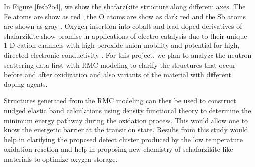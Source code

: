 In Figure \ref{fesb2o4}, we show the shafarzikite structure along different axes. The Fe atoms are show as \color{red} red \color{black}, the O atoms are show as \color{BrickRed} dark red \color{black} and the Sb atoms are shown as \color{Gray} gray \color{black}. Oxygen insertion into cobalt and lead doped derivatives of
shafarzikite show promise in applications of electro-catalysis due to their unique
1-D cation channels with high peroxide anion mobility and potential for high,
directed electronic conductivity \cite{Laune2017}. For this project, we plan to analyze the neutron
scattering data first with RMC modeling to clarify the structures that occur 
before and after oxidization and also variants of the material with different
doping agents.


Structures generated from the RMC modeling can then be used to construct nudged
elastic band \cite{Henkelman2000, Henkelman2000a} calculations using density functional theory to determine the minimum energy pathway during the oxidation process. This would allow one to know the energetic barrier at the transition state.  Results from this study would
help in clarifying the proposed defect cluster produced by the low temperature
oxidation reaction and help in proposing new chemistry of schafarzikite-like materials to optimize oxygen storage. 





 


